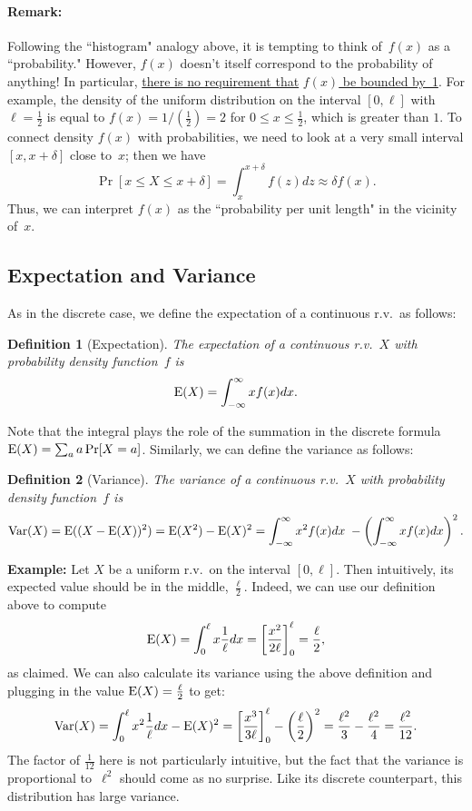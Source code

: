\documentclass[11pt]{article}
\def\ul#1{\underline{#1}}
\def\Ex#1{{\rm E}(#1)}
\def\Var#1{{\rm Var}(#1)}
\newcounter{thm}
\newtheorem{definition}{Definition}[thm]
\begin{document}
\paragraph{Remark:} Following the ``histogram" analogy above,
it is tempting to think of~$f(x)$ as a ``probability."  However,
$f(x)$ doesn't itself correspond to the probability of anything! In particular,
\ul{there is no requirement that} \ul{$f(x)$ be bounded by~1}. For example,
the density of the uniform distribution on the interval $[0,\ell]$ with $\ell = \frac{1}{2}$ is equal to
$f(x) = 1/(\frac{1}{2}) = 2$ for $0 \le x \le \frac{1}{2}$, which is greater than $1$.
To connect density $f(x)$ with probabilities,
we need to look at a very small interval $[x,x+\delta]$ close
to~$x$; then we have
\begin{equation}
\label{eq:small}
   \Pr[x\le X\le x+\delta] = \int_{x}^{x+\delta} f(z) dz \approx \delta f(x).
\end{equation}
Thus, we can interpret $f(x)$ as the ``probability per unit length" in the vicinity
of~$x$.


\subsection*{Expectation and Variance}

As in the discrete case, we define the expectation of a
continuous r.v.\ as follows:
\begin{definition}[Expectation]
The expectation of a continuous r.v.~$X$ with probability
density function~$f$ is $$
   \Ex{X} = \int_{-\infty}^\infty xf(x) dx.  $$
\end{definition}

Note that the integral plays the role of the summation in the
discrete formula $\Ex{X} = \sum_a a\Pr[X=a]$. Similarly, we can define
the variance as follows:

\begin{definition}[Variance]
The variance of a continuous r.v.~$X$ with probability
density function~$f$ is $$
   \Var{X} = \Ex{(X-\Ex{X})^2} = \Ex{X^2} - \Ex{X}^2 = \int_{-\infty}^\infty x^2 f(x) dx \;- \left(\int_{-\infty}^\infty xf(x) dx\right)^2.  $$
\end{definition}


{\bf Example:} Let $X$ be a uniform r.v.\ on the interval
$[0,\ell]$. Then intuitively, its expected value should be in the middle, $\frac{\ell}{2}$.
Indeed, we can use our definition above to compute
$$ \Ex{X} = \int_{0}^\ell x\frac{1}{\ell} dx = \left[\frac{x^2}{2\ell}\right]_0^\ell = \frac{\ell}{2}, $$
as claimed. We can also calculate its variance using the above definition
and plugging in the value $\Ex{X} = \frac{\ell}{2}$ to get:
$$ \Var{X} = \int_{0}^\ell x^2\frac{1}{\ell}dx - \Ex{X}^2 = \left[\frac{x^3}{3\ell}\right]_0^\ell - \left(\frac{\ell}{2}\right)^2 = \frac{\ell^2}{3} - \frac{\ell^2}{4} = \frac{\ell^2}{12}.  $$
The factor of $\frac{1}{12}$ here is not particularly intuitive, but
the fact that the variance is proportional to~$\ell^2$ should come
as no surprise. Like its discrete counterpart, this distribution has
large variance.
\end{document}
